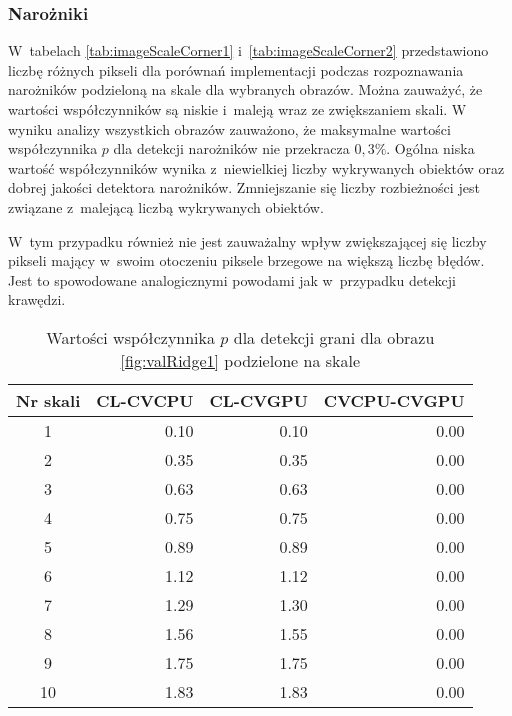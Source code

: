 \subsubsection{Narożniki}
\label{subsubsec:naroznikiTabele}

W~tabelach \ref{tab:imageScaleCorner1} i~\ref{tab:imageScaleCorner2} przedstawiono liczbę różnych pikseli dla porównań implementacji podczas rozpoznawania narożników podzieloną na skale dla wybranych obrazów. Można zauważyć, że wartości współczynników są niskie i~maleją wraz ze zwiększaniem skali. W wyniku analizy wszystkich obrazów zauważono, że maksymalne wartości współczynnika $ p $ dla detekcji narożników nie przekracza $ 0,3 \% $. Ogólna niska wartość współczynników wynika z~niewielkiej liczby wykrywanych obiektów oraz dobrej jakości detektora narożników. Zmniejszanie się liczby rozbieżności jest związane z~malejącą liczbą wykrywanych obiektów.

W~tym przypadku również nie jest zauważalny wpływ zwiększającej się liczby pikseli mający w~swoim otoczeniu piksele brzegowe na większą liczbę błędów. Jest to spowodowane analogicznymi powodami jak w~przypadku detekcji krawędzi.


\begin{center}
\begin{table}
\centering
\caption{Wartości współczynnika $ p $ dla detekcji grani dla obrazu \ref{fig:valRidge1} podzielone na skale}
\label{tab:imageScaleRidge1}
\begin{tabular}{|c|r|r|r|}
 \hline
Nr skali & CL-CVCPU & CL-CVGPU & CVCPU-CVGPU \\ \hline
1        & 0.10     & 0.10     & 0.00        \\ \hline
2        & 0.35     & 0.35     & 0.00        \\ \hline
3        & 0.63     & 0.63     & 0.00        \\ \hline
4        & 0.75     & 0.75     & 0.00        \\ \hline
5        & 0.89     & 0.89     & 0.00        \\ \hline
6        & 1.12     & 1.12     & 0.00        \\ \hline
7        & 1.29     & 1.30     & 0.00        \\ \hline
8        & 1.56     & 1.55     & 0.00        \\ \hline
9        & 1.75     & 1.75     & 0.00        \\ \hline
10       & 1.83     & 1.83     & 0.00        \\ \hline
\end{tabular}
\end{table}
\end{center}


